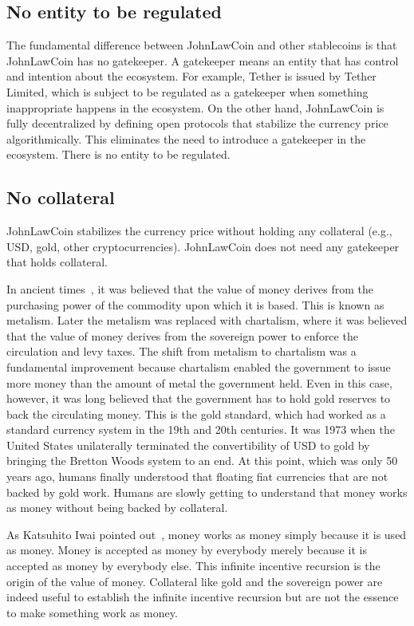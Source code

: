 \documentclass[dvipdfmx,a4paper]{article}
\begin{document}
\subsection{No entity to be regulated}

The fundamental difference between JohnLawCoin and other stablecoins is that JohnLawCoin has no gatekeeper. A gatekeeper means an entity that has control and intention about the ecosystem. For example, Tether is issued by Tether Limited, which is subject to be regulated as a gatekeeper when something inappropriate happens in the ecosystem. On the other hand, JohnLawCoin is fully decentralized by defining open protocols that stabilize the currency price algorithmically. This eliminates the need to introduce a gatekeeper in the ecosystem. There is no entity to be regulated.

\subsection{No collateral}

JohnLawCoin stabilizes the currency price without holding any collateral (e.g., USD, gold, other cryptocurrencies). JohnLawCoin does not need any gatekeeper that holds collateral.

In ancient times~\cite{davies2010history,ferguson2008ascent}, it was believed that the value of money derives from the purchasing power of the commodity upon which it is based. This is known as metalism. Later the metalism was replaced with chartalism, where it was believed that the value of money derives from the sovereign power to enforce the circulation and levy taxes. The shift from metalism to chartalism was a fundamental improvement because chartalism enabled the government to issue more money than the amount of metal the government held. Even in this case, however, it was long believed that the government has to hold gold reserves to back the circulating money. This is the gold standard, which had worked as a standard currency system in the 19th and 20th centuries. It was 1973 when the United States unilaterally terminated the convertibility of USD to gold by bringing the Bretton Woods system to an end. At this point, which was only 50 years ago, humans finally understood that floating fiat currencies that are not backed by gold work. Humans are slowly getting to understand that money works as money without being backed by collateral.

As Katsuhito Iwai pointed out~\cite{iwai1996boostrap,iwai1997evolution}, money works as money simply because it is used as money. Money is accepted as money by everybody merely because it is accepted as money by everybody else. This infinite incentive recursion is the origin of the value of money. Collateral like gold and the sovereign power are indeed useful to establish the infinite incentive recursion but are not the essence to make something work as money.
\end{document}
